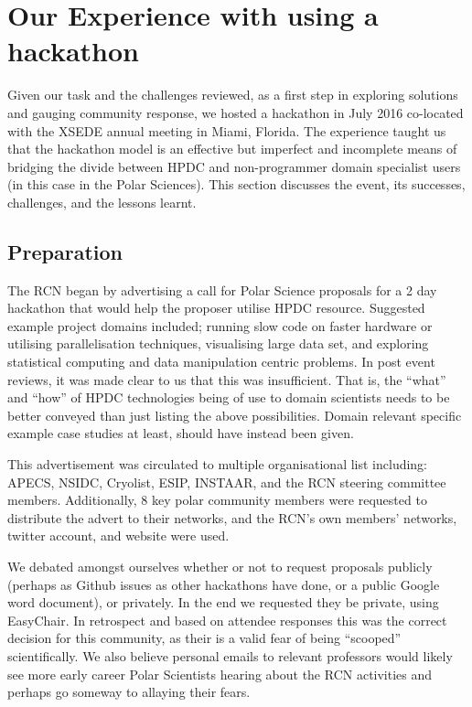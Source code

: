 \documentclass[conference]{IEEEtran}
\begin{document}
\section{Our Experience with using a hackathon}
Given our task and the challenges reviewed, as a first step in exploring solutions and gauging community response, we hosted a hackathon in July 2016 co-located with the XSEDE annual meeting in Miami, Florida. The experience taught us that the hackathon model is an effective but imperfect and incomplete means of bridging the divide between HPDC and non-programmer domain specialist users (in this case in the Polar Sciences). This section discusses the event, its successes, challenges, and the lessons learnt.

\subsection{Preparation}
The RCN began by advertising a call for Polar Science proposals for a 2 day hackathon that would help the proposer utilise HPDC resource.  Suggested example project domains included; running slow code on faster hardware or utilising parallelisation techniques, visualising large data set, and exploring statistical computing and data manipulation centric problems.  In post event reviews, it was made clear to us that this was insufficient.  That is, the ``what'' and ``how'' of HPDC technologies being of use to domain scientists needs to be better conveyed than just listing the above possibilities.  Domain relevant specific example case studies at least, should have instead been given.

This advertisement was circulated to multiple organisational list including: APECS, NSIDC, Cryolist, ESIP, INSTAAR, and the RCN steering committee members.  Additionally, 8 key polar community members were requested to distribute the advert to their networks, and the RCN’s own members’ networks, twitter account, and website were used.

We debated amongst ourselves whether or not to request proposals publicly (perhaps as Github issues as other hackathons have done, or a public Google word document), or privately.  In the end we requested they be private, using EasyChair.  In retrospect and based on attendee responses this was the correct decision for this community, as their is a valid fear of being ``scooped'' scientifically.  We also believe personal emails to relevant professors would likely see more early career Polar Scientists hearing about the RCN activities and perhaps go someway to allaying their fears.
\end{document}
